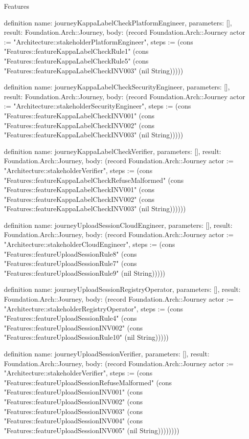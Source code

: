 \begin{lexlean}{Features}
\begin{semanticmodule}
definition{
  name: journeyKappaLabelCheckPlatformEngineer,
  parameters: [],
  result: Foundation.Arch::Journey,
  body: (record Foundation.Arch::Journey {actor := "Architecture::stakeholderPlatformEngineer", steps := (cons "Features::featureKappaLabelCheckRule1" (cons "Features::featureKappaLabelCheckRule5" (cons "Features::featureKappaLabelCheckINV003" (nil String))))})
}

definition{
  name: journeyKappaLabelCheckSecurityEngineer,
  parameters: [],
  result: Foundation.Arch::Journey,
  body: (record Foundation.Arch::Journey {actor := "Architecture::stakeholderSecurityEngineer", steps := (cons "Features::featureKappaLabelCheckINV001" (cons "Features::featureKappaLabelCheckINV002" (cons "Features::featureKappaLabelCheckINV003" (nil String))))})
}

definition{
  name: journeyKappaLabelCheckVerifier,
  parameters: [],
  result: Foundation.Arch::Journey,
  body: (record Foundation.Arch::Journey {actor := "Architecture::stakeholderVerifier", steps := (cons "Features::featureKappaLabelCheckRefuseMalformed" (cons "Features::featureKappaLabelCheckINV001" (cons "Features::featureKappaLabelCheckINV002" (cons "Features::featureKappaLabelCheckINV003" (nil String)))))})
}

definition{
  name: journeyUploadSessionCloudEngineer,
  parameters: [],
  result: Foundation.Arch::Journey,
  body: (record Foundation.Arch::Journey {actor := "Architecture::stakeholderCloudEngineer", steps := (cons "Features::featureUploadSessionRule8" (cons "Features::featureUploadSessionRule7" (cons "Features::featureUploadSessionRule9" (nil String))))})
}

definition{
  name: journeyUploadSessionRegistryOperator,
  parameters: [],
  result: Foundation.Arch::Journey,
  body: (record Foundation.Arch::Journey {actor := "Architecture::stakeholderRegistryOperator", steps := (cons "Features::featureUploadSessionRule4" (cons "Features::featureUploadSessionINV002" (cons "Features::featureUploadSessionRule10" (nil String))))})
}

definition{
  name: journeyUploadSessionVerifier,
  parameters: [],
  result: Foundation.Arch::Journey,
  body: (record Foundation.Arch::Journey {actor := "Architecture::stakeholderVerifier", steps := (cons "Features::featureUploadSessionRefuseMalformed" (cons "Features::featureUploadSessionINV001" (cons "Features::featureUploadSessionINV002" (cons "Features::featureUploadSessionINV003" (cons "Features::featureUploadSessionINV004" (cons "Features::featureUploadSessionINV005" (nil String)))))))})
}


\end{semanticmodule}
\end{lexlean}
